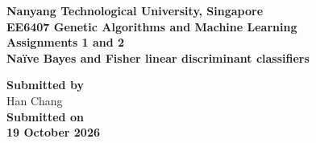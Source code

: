 \begin{titlepage}
\center

\textbf{\large Nanyang Technological University, Singapore}\\[0.5cm]
\textbf{\Large EE6407 Genetic Algorithms and Machine Learning}\\[1cm]

\textbf{\Huge Assignments 1 and 2}\\[0.5cm]
\textbf{\Large Na\"ive Bayes and Fisher linear discriminant classifiers}

\vfill


\textbf{\large Submitted by}\\[0.5cm]
{\large Han Chang} \hspace{1cm}{\large G2602636F}\\[1cm]

\textbf{\large Submitted on}\\[0.5cm]
\textbf{\Large 19 October 2026}

\vspace{1.5cm}

\end{titlepage}
